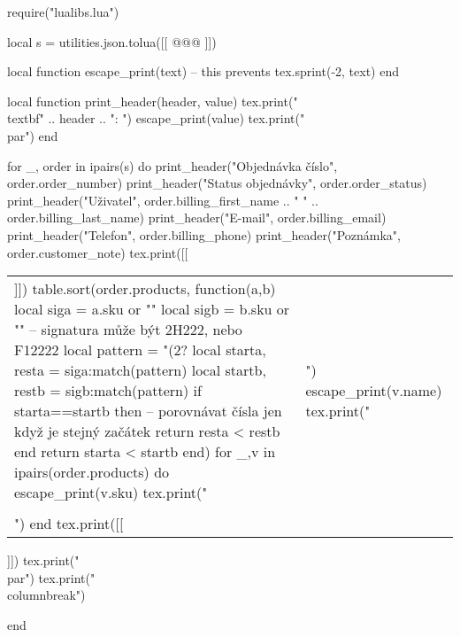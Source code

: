 \documentclass[landscape,a4page]{article}
\begin{document}
\columnseprule=0.3pt
\columnsep=20pt
\parindent=0pt
\parskip=4pt
\begin{multicols*}{3}

\begin{luacode*}
require("lualibs.lua")

local s =  utilities.json.tolua([[
@@@
]])



local function escape_print(text)
  -- this prevents
  tex.sprint(-2, text)
end

local function print_header(header, value)
  tex.print("\\textbf{" .. header .. ":} ")
  escape_print(value)
  tex.print("\\par")
end

for _, order in ipairs(s) do
  print_header("Objednávka číslo", order.order_number)
  print_header("Status objednávky", order.order_status)
  print_header("Uživatel", order.billing_first_name .. " " .. order.billing_last_name)
  print_header("E-mail", order.billing_email)
  print_header("Telefon", order.billing_phone)
  print_header("Poznámka", order.customer_note)
  tex.print([[
  \bigskip
  \begin{tabular}{p{.2\linewidth}p{.5\linewidth}}]])
  table.sort(order.products, function(a,b)
    local siga = a.sku or ""
    local sigb = b.sku or ""
    -- signatura může být 2H222, nebo F12222
    local pattern = "(2?%
    local starta, resta = siga:match(pattern)
    local startb, restb = sigb:match(pattern)
    if starta==startb then
      -- porovnávat čísla jen když je stejný začátek
      return resta < restb 
    end
    return starta < startb
  end)
  for _,v in ipairs(order.products) do
    escape_print(v.sku)
    tex.print("&")
    escape_print(v.name)
    tex.print("\\\\")
  end
  tex.print([[
  \end{tabular}

  \vfill
  \null
   
  ]])
  tex.print("\\par")
  tex.print("\\columnbreak")

end



\end{luacode*}
\end{multicols*}
\end{document}
